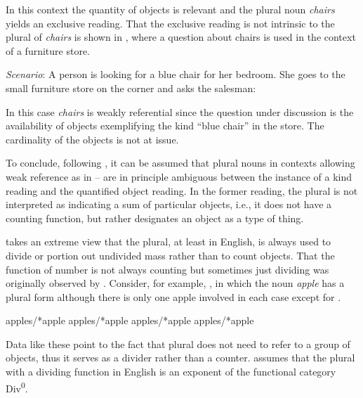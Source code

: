 \documentclass[output=paper,colorlinks,citecolor=brown,
]{langscibook}
\begin{document}
\noindent In this context the quantity of objects is relevant and the plural noun \textit{chairs} yields an exclusive reading. That the exclusive reading is not intrinsic to the plural of \textit{chairs} is shown in , where a question about chairs is used in the context of a furniture store. 


\eanoraggedright\label{ex:13} \textit{Scenario}: A person is looking for a blue chair for her bedroom. She goes to the small 	furniture store on the corner and asks the salesman:
\begin{xlist}
\label{ex:13A:}
\label{ex:13B:}
\end{xlist}
\z

\noindent In this case \textit{chairs} is weakly referential since the question under discussion is the availability of objects exemplifying the kind ``blue chair'' in the store. The cardinality of the objects is not at issue.

To conclude, following \citet{Grimm2013}, it can be assumed that plural nouns in contexts allowing weak reference as in -- are in principle ambiguous between the instance of a kind reading and the quantified object reading. In the former reading, the plural is not interpreted as indicating a sum of particular objects, i.e., it does not have a counting function, but rather designates an object as a type of thing. 

\citet{Borer2005} takes an extreme view that the plural, at least in English, is always used to divide or portion out undivided mass rather than to count objects. That the function of number is not always counting but sometimes just dividing was originally observed by \citet{Krifka1989}. Consider, for example, , in which the noun \textit{apple} has a plural form although there is only one apple involved in each case except for . 

\ea\label{ex:14} 
 apples/*apple
\label{ex:14a}
 apples/*apple
\label{ex:14b}
 apples/*apple
\label{ex:14c}
 apples/*apple \hfill \citep[115]{Borer2005} 
\label{ex:14d}
\z\z

\noindent Data like these point to the fact that plural does not need to refer to a group of objects, thus it serves as a divider rather than a counter. \citet{Borer2005} assumes that the plural with a dividing function in English is an exponent of the functional category Div\textsuperscript{0}. 
\end{document}
